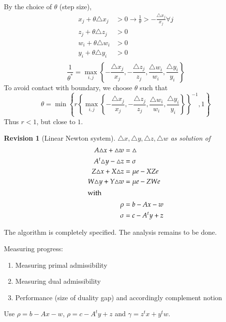\documentclass[a4paper]{article}
\numberwithin{lecref}{subsection}
\newtheorem*{Revision}{Revision}
\newcommand{\Set}[1]{\left\{#1\right\}}
\begin{document}
By the choice of $\theta$ (step size),
\begin{align*}
	x_j + \theta \triangle x_j &> 0 \to \frac1\theta > -\frac{\triangle x_j}{x_j} \forall j \\
	z_j + \theta \triangle z_j &> 0 \\
	w_i + \theta \triangle w_i &> 0 \\
	y_i + \theta \triangle y_i &> 0 \\
\end{align*}
\[ \frac{1}{\theta^*} = \max_{i,j} \Set{-\frac{\triangle x_j}{x_j}, -\frac{\triangle z_j}{z_j}, \frac{\triangle w_i}{w_i}, \frac{\triangle y_i}{y_i}} \]
To avoid contact with boundary, we choose $\theta$ such that
\[ \theta = \min\Set{r \Set{\max_{i, j} \Set{-\frac{\triangle x_j}{x_j}, -\frac{\triangle z_j}{z_j}, \frac{\triangle w_i}{w_i}, \frac{\triangle y_i}{y_i}}}^{-1}, 1} \]
Thus $r < 1$, but close to $1$.

\begin{Revision}[Linear Newton system]
	$\triangle x, \triangle y, \triangle z, \triangle w$ as solution of
	\begin{align*}
		A \triangle x + \triangle w &= \triangle \\
		A^t \triangle y - \triangle z &= \sigma \\
		Z \triangle x + X \triangle z &= \mu e - XZe \\
		W \triangle y + Y \triangle w &= \mu e - ZWe \\
	\intertext{with}
		\rho &= b - Ax - w \\
		\sigma &= c - A^t y + z
	\end{align*}
\end{Revision}

The algorithm is completely specified.
The analysis remains to be done.

Measuring progress:
\begin{enumerate}
	\item Measuring primal admissibility
	\item Measuring dual admissibility
	\item Performance (size of duality gap) and accordingly complement notion
\end{enumerate}
Use $\rho = b - Ax - w$, $\rho = c - A^t y + z$ and $\gamma = z^t x + y^t w$.
\end{document}

